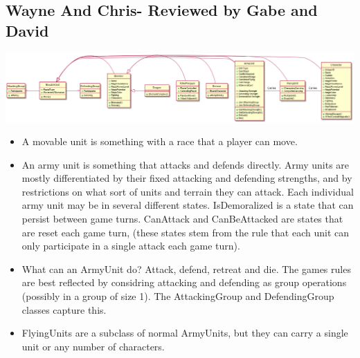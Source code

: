 \documentclass[12pt,a4paper]{article}
\begin{document}
\subsection{Wayne And Chris- Reviewed by Gabe and David}
\includegraphics[width=\textwidth]{UnitDiagrams.png}
\begin{itemize}

\item A movable unit is something with a race that a player can move.

\item An army unit is something that attacks and defends directly. Army
units are mostly differentiated by their fixed attacking and defending
strengths, and by restrictions on what sort of units and terrain they
can attack. Each individual army unit may be in several different
states. IsDemoralized is a state that can persist between game turns.
CanAttack and CanBeAttacked are states that are reset each game turn,
(these states stem from the rule that each unit can only participate
in a single attack each game turn).

\item What can an ArmyUnit do? Attack, defend, retreat and die. The games
rules are best reflected by considring attacking and defending as
group operations (possibly in a group of size 1). The AttackingGroup
and DefendingGroup classes capture this.

\item FlyingUnits are a subclass of normal ArmyUnits, but they can carry a
single unit or any number of characters.
\end{itemize}
\end{document}
